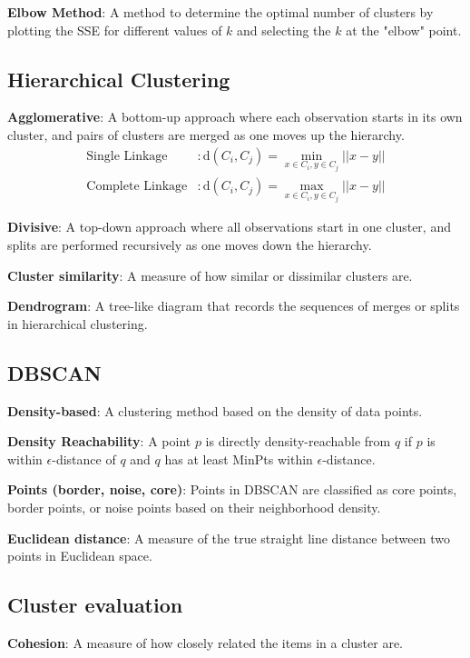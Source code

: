 \documentclass{article}
\begin{document}
\textbf{Elbow Method}: A method to determine the optimal number of clusters by plotting the SSE for different values of \( k \) and selecting the \( k \) at the "elbow" point.

\subsection{Hierarchical Clustering}
\textbf{Agglomerative}: A bottom-up approach where each observation starts in its own cluster, and pairs of clusters are merged as one moves up the hierarchy.
\begin{align*}
    \text{Single Linkage} &: \text{d}(C_i, C_j) = \min_{x \in C_i, y \in C_j} ||x - y|| \\
    \text{Complete Linkage} &: \text{d}(C_i, C_j) = \max_{x \in C_i, y \in C_j} ||x - y||
\end{align*}

\textbf{Divisive}: A top-down approach where all observations start in one cluster, and splits are performed recursively as one moves down the hierarchy.

\textbf{Cluster similarity}: A measure of how similar or dissimilar clusters are.

\textbf{Dendrogram}: A tree-like diagram that records the sequences of merges or splits in hierarchical clustering.

\subsection{DBSCAN}
\textbf{Density-based}: A clustering method based on the density of data points.

\textbf{Density Reachability}: A point \( p \) is directly density-reachable from \( q \) if \( p \) is within \( \epsilon \)-distance of \( q \) and \( q \) has at least MinPts within \( \epsilon \)-distance.

\textbf{Points (border, noise, core)}: Points in DBSCAN are classified as core points, border points, or noise points based on their neighborhood density.

\textbf{Euclidean distance}: A measure of the true straight line distance between two points in Euclidean space.

\subsection{Cluster evaluation}
\textbf{Cohesion}: A measure of how closely related the items in a cluster are.
\end{document}
